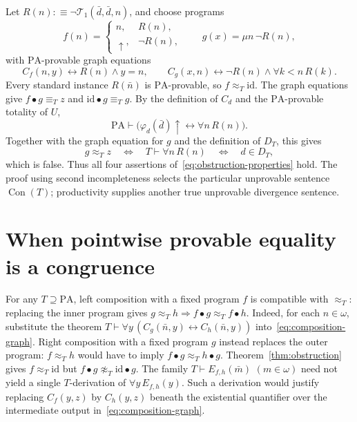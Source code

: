 \documentclass[11pt]{article}
\newcommand{\PA}{\mathrm{PA}}
\newcommand{\Con}{\operatorname{Con}}
\begin{document}
Let $R(n):\!\equiv\neg\mathcal{T}_1(\bar d,\bar d,n)$, and choose programs
\[
 f(n)=
 \begin{cases}
 n,&R(n),\\
 \uparrow,&\neg R(n),
 \end{cases}
 \qquad g(x)=\mu n\,\neg R(n),
\]
with $\PA$-provable graph equations
\[
 C_f(n,y)\longleftrightarrow R(n)\land y=n,
 \qquad
 C_g(x,n)\longleftrightarrow
 \neg R(n)\land\forall k<n\,R(k).
\]
Every standard instance $R(\bar n)$ is $\PA$-provable, so
$f\approx_T\mathrm{id}$. The graph equations give
$f\bullet g\equiv_Tz$ and $\mathrm{id}\bullet g\equiv_Tg$.
By the definition of $C_d$ and the $\PA$-provable totality of $U$,
\[
 \PA\vdash
 \bigl(\varphi_d(\bar d)\uparrow\longleftrightarrow\forall n\,R(n)\bigr).
\]
Together with the graph equation for $g$ and the definition of $D_T$,
this gives
\[
 g\approx_Tz
 \quad\Longleftrightarrow\quad T\vdash\forall n\,R(n)
 \quad\Longleftrightarrow\quad d\in D_T,
\]
which is false. Thus all four assertions
of~\eqref{eq:obstruction-properties} hold.
The proof using second incompleteness selects the particular unprovable
sentence $\Con(T)$; productivity supplies another true unprovable
divergence sentence.


\section{When pointwise provable equality is a congruence}\label{sec:characterization}

For any $T\supseteq\PA$, left composition with a fixed program $f$
is compatible with $\approx_T$: replacing the inner program gives
$g\approx_T h\Rightarrow f\bullet g\approx_T f\bullet h$.
Indeed, for each $n\in\omega$, substitute the theorem
$T\vdash\forall y\,(C_g(\bar n,y)\leftrightarrow C_h(\bar n,y))$
into~\eqref{eq:composition-graph}. Right composition with a fixed program $g$
instead replaces the outer program: $f\approx_T h$ would have to imply
$f\bullet g\approx_T h\bullet g$. Theorem~\ref{thm:obstruction} gives
$f\approx_T\mathrm{id}$ but
$f\bullet g\not\approx_T\mathrm{id}\bullet g$.
The family $T\vdash E_{f,h}(\bar m)$ $(m\in\omega)$ need not yield a
single $T$-derivation of $\forall y\,E_{f,h}(y)$. Such a derivation would justify
replacing $C_f(y,z)$ by $C_h(y,z)$ beneath the existential quantifier over
the intermediate output in~\eqref{eq:composition-graph}.
\end{document}

